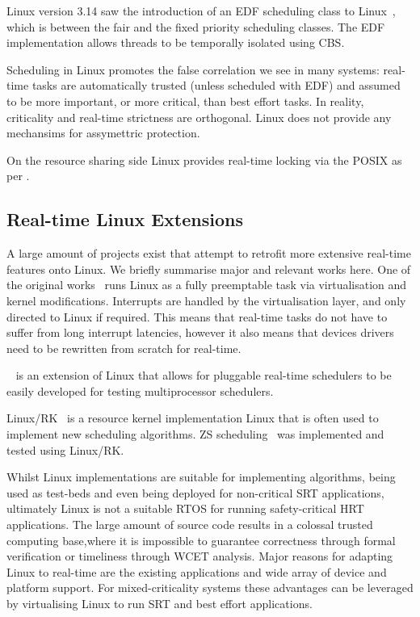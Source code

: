 Linux version 3.14 saw the introduction of an \gls{EDF} scheduling class to
Linux~\citep{Corbet_09}, which is between the fair and the fixed priority scheduling classes.  The
\gls{EDF} implementation allows threads to be temporally isolated using \gls{CBS}.

Scheduling in Linux promotes the false correlation we see in many systems: real-time tasks are automatically trusted (unless scheduled with \gls{EDF}) and assumed to be more important, or more critical, than best effort tasks.
In reality, criticality and real-time strictness are orthogonal.
Linux does not provide any mechansims for assymettric protection.

On the resource sharing side Linux provides real-time locking via the POSIX  as per .
 
\subsection{Real-time Linux Extensions}

A large amount of projects exist that attempt to retrofit more extensive real-time features onto Linux.
We briefly summarise major and relevant works here. 
One of the original works~\citep{Yodaiken_Barabanov_97} runs Linux as a fully preemptable task via virtualisation and kernel modifications.
Interrupts are handled by the virtualisation layer, and only directed to Linux if required.
This means that real-time tasks do not have to suffer from long interrupt latencies, however it also means that devices drivers need to be rewritten from scratch for real-time.

\litmus~\citep{Calandrino_LBDA_07} is an extension of Linux that allows for pluggable real-time schedulers to be easily developed for testing multiprocessor schedulers.

Linux/RK~\citep{Oikawa_Rajkumar_98} is a resource kernel implementation Linux that is often used to implement new scheduling algorithms.
\gls{ZS} scheduling~\citep{deNiz_LR_09} was implemented and tested using Linux/RK.

Whilst Linux implementations are suitable for implementing algorithms, being used as test-beds and even being deployed for non-critical \gls{SRT} applications, ultimately Linux is not a suitable \gls{RTOS} for running safety-critical \gls{HRT} applications. The large amount of source code results in a colossal trusted computing base,where it is impossible to guarantee correctness through formal verification or timeliness through {\gls{WCET}} analysis.  Major reasons for adapting Linux to real-time are the existing applications and wide array of device and platform support. For mixed-criticality systems these advantages can be leveraged by virtualising Linux to run \gls{SRT} and best effort applications.

